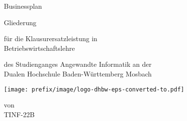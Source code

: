 \def\doctype{Gliederung}
\def\title{Businessplan}
\def\author{TINF-22B}

\begin{titlepage}
\vspace*{\fill}

\begin{center}
	\vspace{5mm}
	
  \huge \title{}
	
	\vspace{14.2pt}
	
  \large \doctype{}
	
	
	\vspace{42.6pt}
	
	\small für die Klausurersatzleistung in \\
	\large Betriebswirtschaftslehre  	
	\vspace{42.6pt}
	
	\small des Studienganges Angewandte Informatik an der \\
	\large Dualen Hochschule Baden-Württemberg Mosbach
    
    \vspace{14.2pt}
    
    \texttt{[image: prefix/image/logo-dhbw-eps-converted-to.pdf]}
	
	\vspace{42.6pt}
	
	\small von \\
  \large \author{}
  \vspace{50pt}
\end{center}

\vspace*{\fill}




\end{titlepage}
